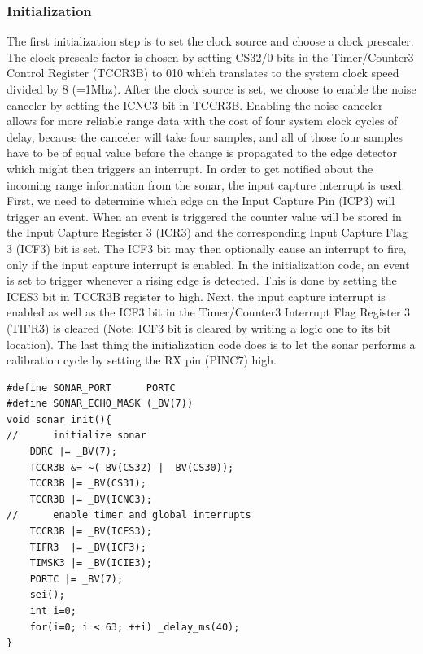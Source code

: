 \subsubsection{Initialization}
The first initialization step is to set the clock source and choose a clock prescaler. The clock prescale factor is chosen by setting CS32/0 bits in the Timer/Counter3 Control Register (TCCR3B) to 010 which translates to the system clock speed divided by 8 (=1Mhz). After the clock source is set, we choose to enable the noise canceler by setting the ICNC3 bit in TCCR3B. Enabling the noise canceler allows for more reliable range data with the cost of four system clock cycles of delay, because the canceler will take four samples, and all of those four samples have to be of equal value before the change is propagated to the edge detector which might then triggers an interrupt. In order to get notified about the incoming range information from the sonar, the input capture interrupt is used. First, we need to determine which edge on the Input Capture Pin (ICP3) will trigger an event. When an event is triggered the counter value will be stored in the Input Capture Register 3 (ICR3) and the corresponding Input Capture Flag 3 (ICF3) bit is set. The ICF3 bit may then optionally cause an interrupt to fire, only if the input capture interrupt is enabled. In the initialization code, an event is set to trigger whenever a rising edge is detected. This is done by setting the ICES3 bit in TCCR3B register to high. Next, the input capture interrupt is enabled as well as the ICF3 bit in the Timer/Counter3 Interrupt Flag Register 3 (TIFR3) is cleared (Note: ICF3 bit is cleared by writing a logic one to its bit location). The last thing the initialization code does is to let the sonar performs a calibration cycle by setting the RX pin (PINC7) high.

\begin{lstlisting}
#define SONAR_PORT      PORTC
#define SONAR_ECHO_MASK (_BV(7))                                        
void sonar_init(){
//      initialize sonar
	DDRC |= _BV(7);                       
    TCCR3B &= ~(_BV(CS32) | _BV(CS30));     
    TCCR3B |= _BV(CS31);                            
    TCCR3B |= _BV(ICNC3);                           
//      enable timer and global interrupts
    TCCR3B |= _BV(ICES3);
    TIFR3  |= _BV(ICF3);
    TIMSK3 |= _BV(ICIE3);
    PORTC |= _BV(7);
    sei();
	int i=0;
    for(i=0; i < 63; ++i) _delay_ms(40);
}
\end{lstlisting}

